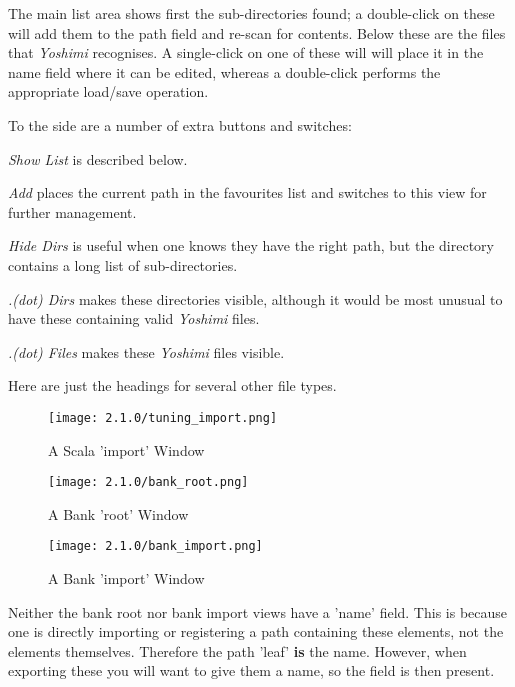   The main list area shows first the sub-directories found; a double-click
   on these will add them to the path field and re-scan for contents. Below
   these are the files that \textsl{Yoshimi} recognises. A single-click on
   one of these will will place it in the name field where it can be edited,
   whereas a double-click performs the appropriate load/save operation.

   To the side are a number of extra buttons and switches:

   \textsl{Show List} is described below.

   \textsl{Add} places the current path in the favourites list and switches to
   this view for further management.

   \textsl{Hide Dirs} is useful when one knows they have the right path, but the
   directory contains a long list of sub-directories.

   \textsl{.(dot) Dirs} makes these directories visible, although it would be most
   unusual to have these containing valid \textsl{Yoshimi} files.

   \textsl{.(dot) Files} makes these \textsl{Yoshimi} files visible.

   Here are just the headings for several other file types.

   \begin{figure}[H]
      \centering
      \texttt{[image: 2.1.0/tuning\_import.png]}
      \caption{A Scala 'import' Window}
   \end{figure}

   \begin{figure}[H]
      \centering
      \texttt{[image: 2.1.0/bank\_root.png]}
      \caption{A Bank 'root' Window}
      \label{fig:filer_bank_root_window}
   \end{figure}

   \begin{figure}[H]
      \centering
      \texttt{[image: 2.1.0/bank\_import.png]}
      \caption{A Bank 'import' Window}
      \label{fig:filer_bank_import_window}
   \end{figure}

   Neither the bank root nor bank import views have a 'name' field. This is
   because one is directly importing or registering a path containing these
   elements, not the elements themselves. Therefore the path 'leaf' \textbf{is}
   the name. However, when exporting these you will want to give them a name, so
   the field is then present.

